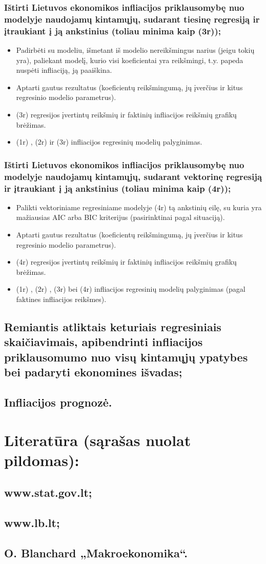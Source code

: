 \documentclass[a4paper]{article}
\begin{document}
\subsubsection{Ištirti Lietuvos ekonomikos infliacijos priklausomybę nuo modelyje naudojamų kintamųjų, sudarant tiesinę regresiją ir  įtraukiant į ją ankstinius (toliau minima kaip (3r));}
\begin{itemize}
\item Padirbėti su modeliu, išmetant iš modelio nereikšmingus narius (jeigu tokių yra), paliekant modelį, kurio visi koeficientai yra reikšmingi, t.y. papeda nuspėti infliaciją, ją paaiškina.
\item Aptarti gautus rezultatus (koeficientų reikšmingumą, jų įverčius ir kitus regresinio modelio parametrus).
\item (3r) regresijos įvertintų reikšmių ir faktinių infliacijos reikšmių grafikų brėžimas.
\item (1r) , (2r) ir (3r) infliacijos regresinių modelių palyginimas.
\end{itemize}
\subsubsection{Ištirti Lietuvos ekonomikos infliacijos priklausomybę nuo modelyje naudojamų kintamųjų, sudarant vektorinę regresiją ir įtraukiant į ją ankstinius (toliau minima kaip (4r));}
\begin{itemize}
\item Palikti vektoriniame regresiniame  modelyje (4r)  tą ankstinių eilę, su kuria yra mažiausias AIC arba BIC kriterijus (pasirinktinai pagal situaciją).
\item Aptarti gautus rezultatus (koeficientų reikšmingumą, jų įverčius ir kitus regresinio modelio parametrus).
\item (4r) regresijos įvertintų reikšmių ir faktinių infliacijos reikšmių grafikų brėžimas.
\item (1r) , (2r) , (3r) bei (4r) infliacijos regresinių modelių palyginimas (pagal faktines infliacijos reikšmes).
\end{itemize}
\subsection{Remiantis atliktais keturiais regresiniais skaičiavimais, apibendrinti infliacijos priklausomumo  nuo visų kintamųjų ypatybes bei padaryti ekonomines išvadas;}
\subsection{	Infliacijos prognozė.}
\section{Literatūra (sąrašas nuolat pildomas):}
\subsection {www.stat.gov.lt;} 
\subsection{www.lb.lt;}
\subsection{O. Blanchard  „Makroekonomika“.}
\end{document}
